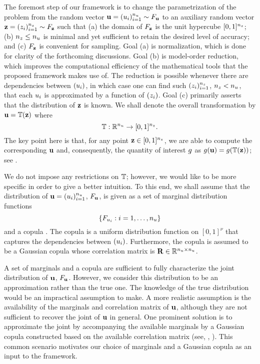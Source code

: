 The foremost step of our framework is to change the parametrization of the
problem from the random vector $\mathbf{u} = (u_i)_{i = 1}^{n_u} \sim F_{\mathbf{u}}$
to an auxiliary random vector $\mathbf{z} = (z_i)_{i = 1}^{n_z} \sim F_{\mathbf{z}}$
such that (a) the domain of $F_{\mathbf{z}}$ is the unit hypercube $[0,
1]^{n_z}$; (b) ${n_z} \leq {n_u}$ is minimal and yet sufficient to retain the desired
level of accuracy; and (c) $F_{\mathbf{z}}$ is convenient for sampling. Goal
(a) is normalization, which is done for clarity of the forthcoming discussions.
Goal (b) is model-order reduction, which improves the computational efficiency
of the mathematical tools that the proposed framework makes use of. The
reduction is possible whenever there are dependencies between $(u_i)$, in which
case one can find such $(z_i)_{i = 1}^{n_z}$, ${n_z} < {n_u}$, that each $u_i$ is
approximated by a function of $(z_i)$. Goal (c) primarily asserts that the
distribution of $\mathbf{z}$ is known. We shall denote the overall transformation by
$\mathbf{u} = \mathbb{T}(\mathbf{z})$ where
\begin{equation} \elab{transformation}
  \transformation: \real^\nu \to [0, 1]^\nz.
\end{equation}
The key point here is that, for any point $\mathbf{z} \in [0, 1]^{n_z}$, we are able to
compute the corresponding $\mathbf{u}$ and, consequently, the quantity of interest $g$
as $g(\mathbf{u}) = g(\mathbb{T}(\mathbf{z}))$; see .

We do not impose any restrictions on $\mathbb{T}$; however, we would like
to be more specific in order to give a better intuition. To this end, we shall
assume that the distribution of $\mathbf{u} = (u_i)_{i = 1}^{n_u}$, $F_{\mathbf{u}}$,
is given as a set of marginal distribution functions
\[
  \{ F_{u_i}: i = 1, \dots, {n_u} \}
\]
and a copula \cite{nelsen2006}. The copula is a uniform distribution function on
$[0, 1]^\nu$ that captures the dependencies between $(u_i)$. Furthermore, the
copula is assumed to be a Gaussian copula whose correlation matrix is
$\mathbf{R} \in \mathbb{R}^{{n_u} \times {n_u}}$.

\begin{remark}
A set of marginals and a copula are sufficient to fully characterize the joint
distribution of $\mathbf{u}$, $F_{\mathbf{u}}$. However, we consider this
distribution to be an approximation rather than the true one. The knowledge of
the true distribution would be an impractical assumption to make. A more
realistic assumption is the availability of the marginals and correlation matrix
of $\mathbf{u}$, although they are not sufficient to recover the joint of $\mathbf{u}$ in
general. One prominent solution is to approximate the joint by accompanying the
available marginals by a Gaussian copula constructed based on the available
correlation matrix (see, \eg, \cite{ukhov2014}). This common scenario motivates
our choice of marginals and a Gaussian copula as an input to the framework.
\end{remark}

